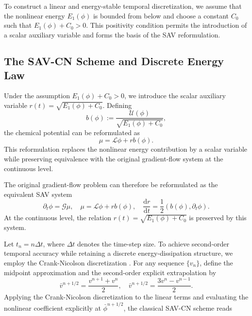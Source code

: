 \documentclass[10pt,reqno]{amsart}
\theoremstyle{remark}
\theoremstyle{definition}
\begin{document}
To construct a linear and energy-stable temporal discretization, we assume that the nonlinear energy $E_1(\phi)$ is bounded from below and choose a constant $C_0$ such that $E_1(\phi) + C_0 > 0$. This positivity condition permits the introduction of a scalar auxiliary variable and forms the basis of the SAV reformulation.

\subsection{The SAV-CN Scheme and Discrete Energy Law}
Under the assumption $E_1(\phi) + C_0 > 0$, we introduce the scalar auxiliary variable $r(t) = \sqrt{E_1(\phi) + C_0}$. Defining
$$b(\phi) := \frac{\mathcal{U}(\phi)}{\sqrt{E_1(\phi) + C_0}},$$
the chemical potential can be reformulated as
\begin{equation}
  \mu = \mathcal{L}\phi + r b(\phi) .
\end{equation}
This reformulation replaces the nonlinear energy contribution by a scalar variable while preserving equivalence with the original gradient-flow system at the continuous level.

The original gradient-flow problem can therefore be reformulated as the equivalent SAV system
\begin{equation}
  \partial_t \phi = \mathcal{G} \mu, \quad \mu = \mathcal{L}\phi + r b(\phi), \quad \frac{\mathrm{d}r}{\mathrm{d}t} = \frac{1}{2} (b(\phi), \partial_t \phi).
\end{equation}
At the continuous level, the relation $r(t) = \sqrt{E_1(\phi) + C_0}$ is preserved by this system.

Let $t_n=n\Delta t$, where $\Delta t$ denotes the time-step size. To achieve second-order temporal accuracy while retaining a discrete energy-dissipation structure, we employ the Crank-Nicolson discretization \cite{CrankNicolson1996}. For any sequence $\{v_n\}$, define the midpoint approximation and the second-order explicit extrapolation by
\begin{equation}
  \bar{v}^{n+1/2} = \frac{v^{n+1}+v^n}{2}, \quad \bar{v}^{n+1/2} = \frac{3v^n-v^{n-1}}{2}.
\end{equation}
Applying the Crank-Nicolson discretization to the linear terms and evaluating the nonlinear coefficient explicitly at $\bar{\phi} ^ {n+1/2}$, the classical SAV-CN scheme \cite{SHEN2018407} reads
\end{document}
